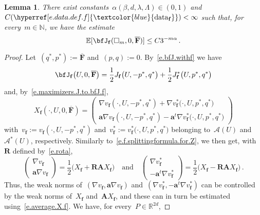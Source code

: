 \documentclass[11pt,twoside]{article} %
\let\oldsquare\square %
\renewcommand{\square}{\oldsquare}
\numberwithin{equation}{section}
\newtheorem{lemma}[theorem]{Lemma}
\theoremstyle{definition}
\newcommand{\datareff}{\hyperref[e.data.def.f]{\textcolor{blue}{\ensuremath{\mathrm{data}_{\mathbf{f}}}}}}
\newcommand*{\N}{\ensuremath{\mathbb{N}}}
\newcommand*{\R}{\ensuremath{\mathbb{R}}}
\newcommand{\qand}{\quad \mbox{and} \quad }
\newcommand{\f}{\mathbf{f}}
\renewcommand{\a}{\mathbf{a}}
\newcommand{\cu}{\square}
\newcommand{\E}{\mathbb{E}}
\newcommand{\X}{\mathcal{X}}
\renewcommand{\O}{\mathcal{O}}
\newcommand{\A}{\mathcal{A}}
\newcommand{\bfA}{\mathbf{A}}
\newcommand{\bfF}{\mathbf{F}}
\newcommand{\rota}{\mathbf{R}}
\begin{document}
\begin{lemma} \label{l.f.J.minimal.expectation}
There exist constants~$\alpha(\beta,d,\lambda,\Lambda) \in (0,1)$ and~$C(\datareff) < \infty$ such that, 
for every~$m\in\N$, we have the estimate
\begin{equation}  \label{e.f.J.minimal.expectation}
\E[\bfJ_{\f}(\cu_{m},0,\overline{\bfF})] \leq C 3^{-m\alpha} \,.
\end{equation}
\end{lemma}
\begin{proof}
Let~$(q^*,p^*) :=  \overline{\bfF}$ and~$(p,q) := 0$.  
By~\eqref{e.bfJ.withf} we have 
\begin{equation*} 
\bfJ_{\f}\bigl(U, 0, \overline{\bfF} \bigr)
=
\frac12 J_{\f}\bigl(U,-p^*,q^*\bigr)
+ 
\frac12 J^*_{\f}\bigl(U,p^*,q^*\bigr) 
\end{equation*}
and, by~\eqref{e.maximizers.J.to.bfJ.f},
\begin{equation*} 
X_{\f}(\cdot,U,0,\overline{\bfF}) 
= 
\begin{pmatrix} \nabla v_{\f} (\cdot,U,-p^*,q^*)
+ 
\nabla v_{\f}^*\bigl(\cdot,U,p^*,q^*\bigr) \\ 
\a \nabla v_{\f} (\cdot,U,-p^*,q^*)
- 
\a^t \nabla v_{\f}^*\bigl(\cdot,U,p^*,q^*\bigr)
\end{pmatrix}
\end{equation*}
with~$v_{\f} := v_{\f} (\cdot,U,-p^*,q^*)$ and~$v_{\f}^* := v_{\f}^*\bigl(\cdot,U,p^*,q^*\bigr)$ belonging to~$\A(U)$ and~$\A^*(U)$, respectively. Similarly to~\eqref{e.f.splittingformula.for.Z}, 
we then get, with~$\rota$ defined by~\eqref{e.rota}, 
\begin{equation*} 
\begin{pmatrix} \nabla v_{\f} \\ \a \nabla v_{\f} \end{pmatrix} = \frac12 \bigl(X_{\f} + \rota \bfA X_{\f} \bigr) 
\qand
\begin{pmatrix} \nabla v_{\f}^* \\ - \a^t \nabla v_{\f}^* \end{pmatrix} = \frac12 \bigl(X_{\f} - \rota \bfA X_{\f} \bigr) 
 \,.
\end{equation*}
Thus, the weak norms of~$(\nabla v_{\f},\a \nabla v_{\f})$ and~$(\nabla v_{\f}^*,- \a^t \nabla v_{\f}^*)$ can be controlled by the weak norms of~$X_{\f}$ and~$\bfA X_{\f}$, and these can in turn be estimated using~\eqref{e.average.X.f}. We have, for every~$P \in \R^{2d}$, 

\end{proof}
\end{document}
